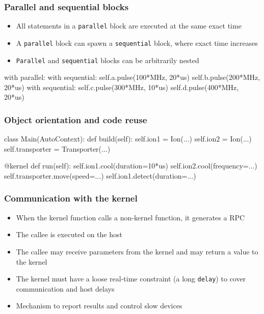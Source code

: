 \documentclass{beamer}
\begin{document}
\begin{frame}[fragile]
\frametitle{\selectfont Parallel and sequential blocks}
\begin{itemize}
\item All statements in a \verb!parallel! block are executed at the same exact time
\item A \verb!parallel! block can spawn a \verb!sequential! block, where exact time increases
\item \verb!Parallel! and \verb!sequential! blocks can be arbitrarily nested
\end{itemize}
\begin{verbatimtab}
with parallel:
    with sequential:
        self.a.pulse(100*MHz, 20*us)
        self.b.pulse(200*MHz, 20*us)
    with sequential:
        self.c.pulse(300*MHz, 10*us)
        self.d.pulse(400*MHz, 20*us)
\end{verbatimtab}
\end{frame}

\begin{frame}[fragile]
\frametitle{\selectfont Object orientation and code reuse}
\begin{verbatimtab}
class Main(AutoContext):
    def build(self):
        self.ion1 = Ion(...)
        self.ion2 = Ion(...)
        self.transporter = Transporter(...)

    @kernel
    def run(self):
        self.ion1.cool(duration=10*us)
        self.ion2.cool(frequency=...)
        self.transporter.move(speed=...)
        self.ion1.detect(duration=...)
\end{verbatimtab}
\end{frame}

\begin{frame}[fragile]
\frametitle{\selectfont Communication with the kernel}
\begin{itemize}
\item When the kernel function calls a non-kernel function, it generates a RPC
\item The callee is executed on the host
\item The callee may receive parameters from the kernel and may return a value to the kernel
\item The kernel must have a loose real-time constraint (a long \verb!delay!) to cover communication and host delays
\item Mechanism to report results and control slow devices
\end{itemize}
\end{frame}
\end{document}

